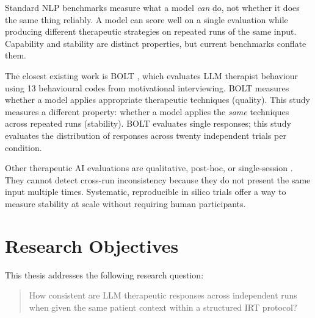Standard NLP benchmarks measure what a model \emph{can} do, not whether it does the same thing reliably.
A model can score well on a single evaluation while producing different therapeutic strategies on repeated runs of the same input.
Capability and stability are distinct properties, but current benchmarks conflate them.

The closest existing work is BOLT \autocite{B97RI7GA}, which evaluates LLM therapist behaviour using 13 behavioural codes from motivational interviewing.
BOLT measures whether a model applies appropriate therapeutic techniques (quality).
This study measures a different property: whether a model applies the \emph{same} techniques across repeated runs (stability).
BOLT evaluates single responses; this study evaluates the distribution of responses across twenty independent trials per condition.

Other therapeutic AI evaluations are qualitative, post-hoc, or single-session \autocite{JX7N8VWS}.
They cannot detect cross-run inconsistency because they do not present the same input multiple times.
Systematic, reproducible in silico trials offer a way to measure stability at scale without requiring human participants.


\section{Research Objectives}
\label{sec:intro-objectives}

This thesis addresses the following research question:

\begin{quote}
How consistent are LLM therapeutic responses across independent runs when given the same patient context within a structured IRT protocol?
\end{quote}

